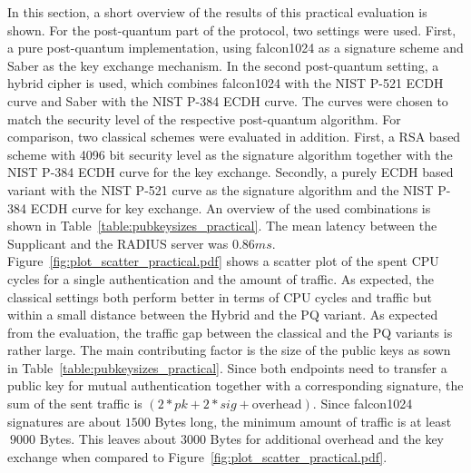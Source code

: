 In this section, a short overview of the results of this practical evaluation is shown. For the post-quantum part of the protocol, two settings were used. First, a pure post-quantum implementation, using falcon1024 as a signature scheme and Saber as the key exchange mechanism. In the second post-quantum setting, a hybrid cipher is used, which combines falcon1024 with the NIST P-521 \ac{ECDH} curve and Saber with the NIST P-384 \ac{ECDH} curve. The curves were chosen to match the security level of the respective post-quantum algorithm. For comparison, two classical schemes were evaluated in addition. First, a RSA based scheme with 4096 bit security level as the signature algorithm together with the NIST P-384 \ac{ECDH} curve for the key exchange. Secondly, a purely \ac{ECDH} based variant with the NIST P-521 curve as the signature algorithm and the NIST P-384 \ac{ECDH} curve for key exchange. An overview of the used combinations is shown in Table~\ref{table:pubkeysizes_practical}. The mean latency between the Supplicant and the RADIUS server was \(0.86 ms\). Figure~\ref{fig:plot_scatter_practical.pdf} shows a scatter plot of the spent CPU cycles for a single authentication and the amount of traffic. As expected, the classical settings both perform better in terms of CPU cycles and traffic but within a small distance between the Hybrid and the PQ variant. As expected from the evaluation, the traffic gap between the classical and the PQ variants is rather large. The main contributing factor is the size of the public keys as sown in Table~\ref{table:pubkeysizes_practical}. Since both endpoints need to transfer a public key for mutual authentication together with a corresponding signature, the sum of the sent traffic is \((2*pk + 2*sig + \text{overhead})\). Since falcon1024 signatures are about \(1500\) Bytes long, the minimum amount of traffic is at least \(~9000\) Bytes. This leaves about \(3000\) Bytes for additional overhead and the key exchange when compared to Figure~\ref{fig:plot_scatter_practical.pdf}.

